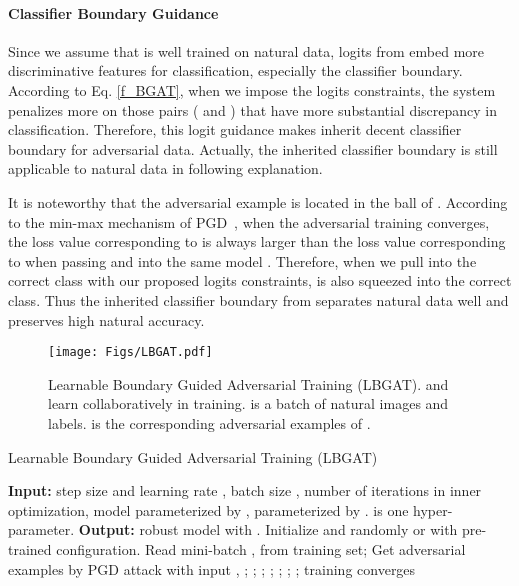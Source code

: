\documentclass[final]{cvpr}
\begin{document}
\paragraph{Classifier Boundary Guidance} 
Since we assume that  is well trained on natural data, logits from  embed more discriminative features for classification, especially the classifier boundary. According to Eq. \eqref{f_BGAT}, when we impose the logits constraints, the system penalizes more on those pairs ( and ) that have more substantial discrepancy in classification. Therefore, this logit guidance makes  inherit decent classifier boundary for adversarial data. Actually, the inherited classifier boundary is still applicable to natural data in following explanation.

It is noteworthy that the adversarial example  is located in the  ball of . According to the min-max mechanism of PGD~\cite{DBLP:conf/iclr/MadryMSTV18}, when the adversarial training converges, the loss value corresponding to  is always larger than the loss value corresponding to  when passing  and  into the same model . Therefore, when we pull  into the correct class with our proposed logits constraints,  is also squeezed into the correct class. Thus the inherited classifier boundary from  separates natural data well and preserves high natural accuracy. 

\begin{figure}
	\begin{center}
		\texttt{[image: Figs/LBGAT.pdf]}
		\caption{Learnable Boundary Guided Adversarial Training (LBGAT).  and  learn collaboratively in training.  is a batch of natural images and labels.  is the corresponding adversarial examples of .} 
		\label{fig:LBGAT}
	\end{center}
    \vspace{-0.2in}
\end{figure}

\begin{algorithm}[t]
	\caption{Learnable Boundary Guided Adversarial Training (LBGAT)}
	\label{algorithm_LBGAT}
	\begin{algorithmic}[1]
		\State \textbf{Input:} step size  and learning rate , batch size , number of iterations  in inner optimization, model  parameterized by ,  parameterized by .  is one hyper-parameter.
		\State \textbf{Output:} robust model  with .
		\State Initialize  and  randomly or with pre-trained configuration.
		\Repeat
		\State Read mini-batch ,  from training set;
		\State Get adversarial examples  by PGD attack with input , ;
		\State ;
		\State ;
		\State ;
		\State ;
		\State ;
		\State ;
		\Until training converges
	\end{algorithmic}
\end{algorithm}
\end{document}
